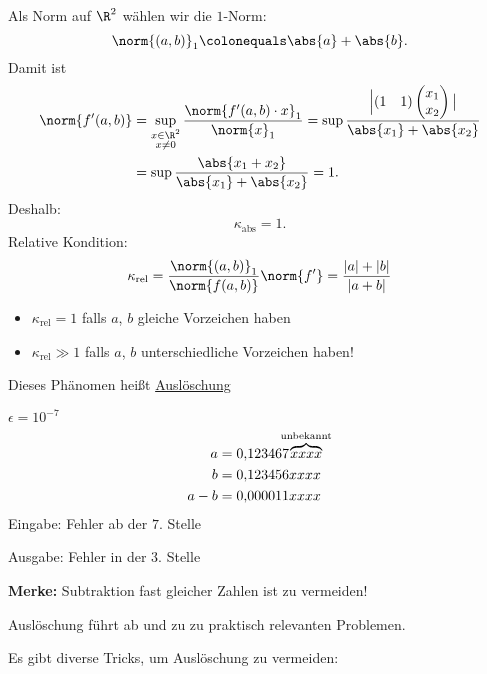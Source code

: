 Als Norm auf $\R^2$ wählen wir die $1$-Norm:
\begin{equation*}
\norm{(a,b)}_1 \colonequals \abs{a} + \abs{b}.
\end{equation*}
Damit ist
\begin{align*}
\norm{f'(a,b)}
 & = \sup_{\substack{x \in \R^2 \\ x \neq 0}} \frac{\norm{f'(a,b) \cdot x}_1}{\norm{x}_1}
   = \sup \frac{\Big\vert (1 \quad 1) \begin{pmatrix} x_1 \\ x_2 \end{pmatrix}\big\vert}{\abs{x_1} + \abs{x_2}} \\
 & =
 \sup \frac{\abs{x_1 + x_2}}{\abs{x_1} + \abs{x_2}} = 1.
\end{align*}
Deshalb:
\begin{equation*}
\kappa_\text{abs} = 1.
\end{equation*}
Relative Kondition:
\begin{equation*}
\kappa_\text{rel}
=
\frac{\norm{(a,b)}_1}{\norm{f(a,b)}} \norm{f'} = \frac{\vert a \vert + \vert b \vert}{\vert a  + b \vert}
\end{equation*}
\begin{itemize}
\item $\kappa_\text{rel} =1 $ falls $a$, $b$ gleiche Vorzeichen haben
\item $\kappa_\text{rel} \gg 1$ falls $a$, $b$ unterschiedliche Vorzeichen haben!
\end{itemize}
Dieses Phänomen heißt \underline{Auslöschung}
\begin{bsp}
$\epsilon = 10^{-7}$
\begin{align*}
a   & = 0{,}123467\hspace{-1.8ex}\overbrace{xxxx}^{\textnormal{unbekannt}} \\
b   & = 0{,}123456xxxx \\
a-b & = 0{,}000011xxxx
\end{align*}
Eingabe: Fehler ab der $7.$ Stelle

Ausgabe: Fehler in der $3.$ Stelle

\medskip

\textbf{Merke:} Subtraktion fast gleicher Zahlen ist zu vermeiden!
\end{bsp}

Auslöschung führt ab und zu zu praktisch relevanten Problemen.

Es gibt diverse Tricks, um Auslöschung zu vermeiden:

